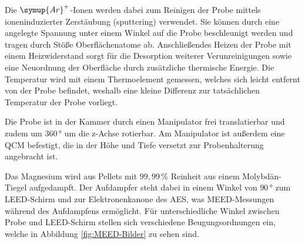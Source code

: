 Die $\symup{Ar}^+$-Ionen werden dabei zum Reinigen der Probe mittels ioneninduzierter Zerstäubung (sputtering) verwendet.
Sie können durch eine angelegte Spannung unter einem Winkel auf die Probe beschleunigt werden und tragen durch Stöße Oberflächenatome ab.
Anschließendes Heizen der Probe mit einem Heizwiderstand sorgt für die Desorption weiterer Verunreinigungen sowie eine Neuordnung der 
Oberfläche durch zusätzliche thermische Energie.
 Die Temperatur wird mit einem Thermoelement gemessen, welches sich leicht entfernt von der Probe befindet, weshalb 
eine kleine Differenz zur tatsächlichen Temperatur der Probe vorliegt.

Die Probe ist in der Kammer durch einen Manipulator frei translatierbar und zudem um $360\,\si{\degree}$ um die z-Achse rotierbar.
Am Manipulator ist außerdem eine QCM befestigt, die in der Höhe und  Tiefe versetzt zur Probenhalterung angebracht ist.

Das Magnesium wird aus Pellets mit $99,99\,\si{\percent}$ Reinheit aus einem Molybdän-Tiegel aufgedampft.
Der Aufdampfer steht dabei in einem Winkel von $90\,\si{\degree}$ zum LEED-Schirm und zur Elektronenkanone des AES, was MEED-Messungen während des Aufdampfens ermöglicht.
Für unterschiedliche Winkel zwischen Probe und LEED-Schirm stellen sich verschiedene Beugungsordnungen ein, welche in Abbildung \ref{fig:MEED-Bilder} zu sehen sind.



